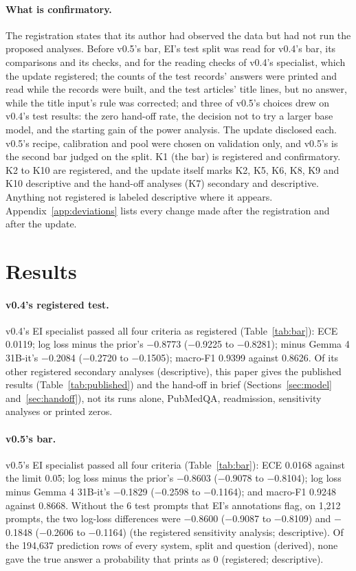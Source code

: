 \documentclass[11pt,letterpaper]{article}
\begin{document}
\paragraph{What is confirmatory.} The registration states that its author had observed the data but had not run the proposed analyses. Before v0.5's bar, EI's test split was read for v0.4's bar, its comparisons and its checks, and for the reading checks of v0.4's specialist, which the update registered; the counts of the test records' answers were printed and read while the records were built, and the test articles' title lines, but no answer, while the title input's rule was corrected; and three of v0.5's choices drew on v0.4's test results: the zero hand-off rate, the decision not to try a larger base model, and the starting gain of the power analysis. The update disclosed each. v0.5's recipe, calibration and pool were chosen on validation only, and v0.5's is the second bar judged on the split. K1 (the bar) is registered and confirmatory. K2 to K10 are registered, and the update itself marks K2, K5, K6, K8, K9 and K10 descriptive and the hand-off analyses (K7) secondary and descriptive. Anything not registered is labeled descriptive where it appears. Appendix~\ref{app:deviations} lists every change made after the registration and after the update.

\section{Results}
\label{sec:results}

\paragraph{v0.4's registered test.} v0.4's EI specialist passed all four criteria as registered (Table~\ref{tab:bar}): ECE 0.0119; log loss minus the prior's $-$0.8773 ($-$0.9225 to $-$0.8281); minus Gemma 4 31B-it's $-$0.2084 ($-$0.2720 to $-$0.1505); macro-F1 0.9399 against 0.8626. Of its other registered secondary analyses (descriptive), this paper gives the published results (Table~\ref{tab:published}) and the hand-off in brief (Sections~\ref{sec:model} and~\ref{sec:handoff}), not its runs alone, PubMedQA, readmission, sensitivity analyses or printed zeros.

\paragraph{v0.5's bar.} v0.5's EI specialist passed all four criteria (Table~\ref{tab:bar}): ECE 0.0168 against the limit 0.05; log loss minus the prior's $-$0.8603 ($-$0.9078 to $-$0.8104); log loss minus Gemma 4 31B-it's $-$0.1829 ($-$0.2598 to $-$0.1164); and macro-F1 0.9248 against 0.8668. Without the 6 test prompts that EI's annotations flag, on 1,212 prompts, the two log-loss differences were $-$0.8600 ($-$0.9087 to $-$0.8109) and $-$0.1848 ($-$0.2606 to $-$0.1164) (the registered sensitivity analysis; descriptive). Of the 194,637 prediction rows of every system, split and question (derived), none gave the true answer a probability that prints as 0 (registered; descriptive).
\end{document}
